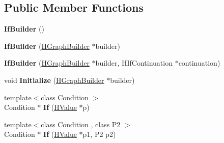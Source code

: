 \subsection*{Public Member Functions}
\begin{DoxyCompactItemize}
\item 
\hypertarget{classv8_1_1internal_1_1_h_graph_builder_1_1_v8___f_i_n_a_l_add71080e932a45e785ce700d0414dd78}{}{\bfseries If\+Builder} ()\label{classv8_1_1internal_1_1_h_graph_builder_1_1_v8___f_i_n_a_l_add71080e932a45e785ce700d0414dd78}

\item 
\hypertarget{classv8_1_1internal_1_1_h_graph_builder_1_1_v8___f_i_n_a_l_a485b1e7ecb1f6177cd07192291672d93}{}{\bfseries If\+Builder} (\hyperlink{classv8_1_1internal_1_1_h_graph_builder}{H\+Graph\+Builder} $\ast$builder)\label{classv8_1_1internal_1_1_h_graph_builder_1_1_v8___f_i_n_a_l_a485b1e7ecb1f6177cd07192291672d93}

\item 
\hypertarget{classv8_1_1internal_1_1_h_graph_builder_1_1_v8___f_i_n_a_l_a4437f9d382a84dcd35ba94661d66b5bb}{}{\bfseries If\+Builder} (\hyperlink{classv8_1_1internal_1_1_h_graph_builder}{H\+Graph\+Builder} $\ast$builder, H\+If\+Continuation $\ast$continuation)\label{classv8_1_1internal_1_1_h_graph_builder_1_1_v8___f_i_n_a_l_a4437f9d382a84dcd35ba94661d66b5bb}

\item 
\hypertarget{classv8_1_1internal_1_1_h_graph_builder_1_1_v8___f_i_n_a_l_a9aec060db345b596867866b341a3482b}{}void {\bfseries Initialize} (\hyperlink{classv8_1_1internal_1_1_h_graph_builder}{H\+Graph\+Builder} $\ast$builder)\label{classv8_1_1internal_1_1_h_graph_builder_1_1_v8___f_i_n_a_l_a9aec060db345b596867866b341a3482b}

\item 
\hypertarget{classv8_1_1internal_1_1_h_graph_builder_1_1_v8___f_i_n_a_l_aaa1a11a1375981e04bc03301e1c145e6}{}{\footnotesize template$<$class Condition $>$ }\\Condition $\ast$ {\bfseries If} (\hyperlink{classv8_1_1internal_1_1_h_value}{H\+Value} $\ast$p)\label{classv8_1_1internal_1_1_h_graph_builder_1_1_v8___f_i_n_a_l_aaa1a11a1375981e04bc03301e1c145e6}

\item 
\hypertarget{classv8_1_1internal_1_1_h_graph_builder_1_1_v8___f_i_n_a_l_a7ec5e62ffe52d40529dc21823012a2e6}{}{\footnotesize template$<$class Condition , class P2 $>$ }\\Condition $\ast$ {\bfseries If} (\hyperlink{classv8_1_1internal_1_1_h_value}{H\+Value} $\ast$p1, P2 p2)\label{classv8_1_1internal_1_1_h_graph_builder_1_1_v8___f_i_n_a_l_a7ec5e62ffe52d40529dc21823012a2e6}


\end{DoxyCompactItemize}
